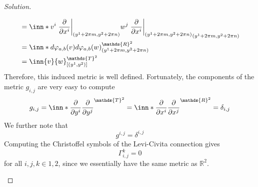 \documentclass[a4paper]{article}
\begin{document}
\begin{proof}[Solution]
\begin{enumerate}[(a)]
\[\begin{aligned}
                                                   &= \inn*{ v^i \eval{\pdv{x^i}}_{(y^1 + 2\pi m, y^2 + 2\pi n)}}{w^j \eval{\pdv{x^i}}_{(y^1 + 2\pi m, y^2 + 2\pi n)}}_{(y^1 + 2\pi m, y^2 + 2\pi n)}  \\
                                                   &= \inn*{d\varphi_{a,b}(v)}{d\varphi_{a,b}(w)}_{(y^1 + 2\pi m, y^2 + 2\pi n)}^{\mathds{R}^2} \\
                                                   &= \inn{v}{w}^{\mathds{T}^2}_{[(y^1, y^2)]}
        \end{aligned}
      \]
      Therefore, this induced metric is well defined. Fortunately, the components of the metric $g_{i,j}$ are very easy to compute
      \[
        g_{i,j} = \inn*{\pdv{y^i}}{\pdv{y^j}}^{\mathds{T}^2} = \inn*{\pdv{x^i}}{\pdv{x^j}}^{\mathds{R}^2} = \delta_{i,j}
      \]
      We further note that
      \[
        g^{i,j} = \delta^{i,j}
      \]
      Computing the Christoffel symbols of the Levi-Civita connection gives
      \[
        \Gamma^{k}_{i,j} = 0
      \]
      for all $i,j,k \in {1,2}$, since we essentially have the same metric as $\mathds{R}^2$.
  \end{enumerate}
  
\end{proof}
\end{document}
